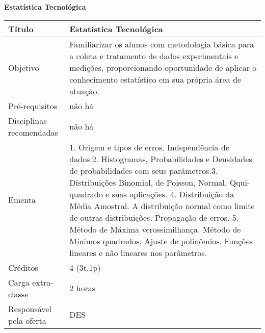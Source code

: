 \textbf{Estatística Tecnológica}
\begin{center}
\begin{tabular}{|p{4.5cm}|p{10.0cm}|} \hline
Título & Estatística Tecnológica \\ \hline
Objetivo & Familiarizar os alunos com metodologia básica para a coleta e tratamento de dados experimentais e medições, proporcionando oportunidade de aplicar o conhecimento estatístico em sua própria área de atuação. \\ \hline
Pré-requisitos & não há \\ \hline
Disciplinas recomendadas & não há \\ \hline
Ementa & 1. Origem e tipos de erros. Independência de dados.2. Histogramas, Probabilidades e Densidades de probabilidades com seus parâmetros.3. Distribuições Binomial, de Poisson, Normal, Qqui-quadrado e suas aplicações. 4. Distribuição da Média Amostral. A distribuição normal como limite de outras distribuições. Propagação de erros. 5. Método de Máxima verossimilhança. Método de Mínimos quadrados. Ajuste de polinômios. Funções lineares e não lineares nos parâmetros.  \\ \hline
Créditos & 4 (3t,1p) \\ \hline
Carga extra-classe & 2 horas\\ \hline
Responsável pela oferta & DES \\ \hline
\end{tabular}
\end{center}

